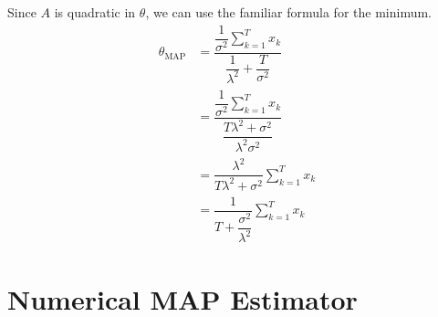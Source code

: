 \documentclass[]{article}
\begin{document}
Since \(A\) is quadratic in \(\theta\), we can use the familiar formula
for the minimum. \begin{align}
\theta_{\mathrm{MAP}} &= \dfrac{\dfrac{1}{\sigma^2} \sum_{k=1}^T x_k}{\dfrac{1}{\lambda^2} + \dfrac{T}{\sigma^2}}\\
&= \dfrac{\dfrac{1}{\sigma^2} \sum_{k=1}^T x_k}
{\dfrac{T\lambda^2 + \sigma^2}{\lambda^2\sigma^2}}\\
&= \dfrac{\lambda^2}{T\lambda^2 + \sigma^2} \sum_{k=1}^T x_k\\
&= \dfrac{1}{T + \dfrac{\sigma^2}{\lambda^2}} \sum_{k=1}^T x_k
\end{align}

\hypertarget{numerical-map-estimator}{%
\section{Numerical MAP Estimator}\label{numerical-map-estimator}}
\end{document}
